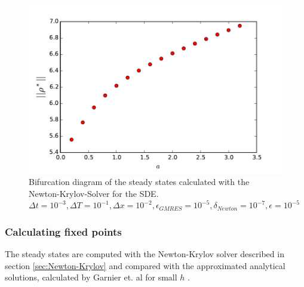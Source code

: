 \documentclass[]{article}
\theoremstyle{definition}
\begin{document}
\begin{figure}
\includegraphics{../Problems/WeightedParticles/checkSystem/plots/bifurcation_pde(D)}
\caption{  Bifurcation diagram of the steady states calculated with the Newton-Krylov-Solver for the SDE. $\Delta t = 10^{-3}, \Delta T = 10^{-1}, \Delta x = 10^{-2}, \epsilon_{GMRES}=10^{-5},  \delta_{Newton} = 10^{-7}, \epsilon=10^{-5}$
}
\end{figure}


\subsubsection{Calculating fixed points}
The steady  states are computed with the Newton-Krylov solver described in section \ref{sec:Newton-Krylov} and compared with the approximated analytical solutions, calculated by Garnier et. al for small $h$ \cite{Garnier}.
\end{document}
